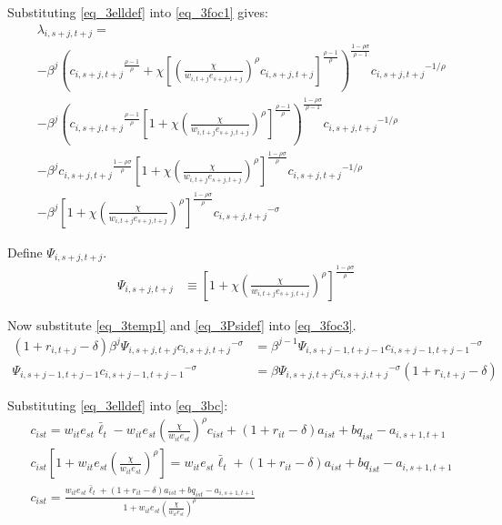 \documentclass[letterpaper,12pt]{article}
\theoremstyle{definition}
\numberwithin{equation}{section}
\begin{document}
\begin{spacing}{1.5}
	Substituting \eqref{eq_3elldef} into \eqref{eq_3foc1} gives:
	\begin{align}
	    & \lambda_{i,s+j,t+j} = \nonumber \\
		& - \beta^j \left( {c_{i,s+j,t+j}}^{\frac{\rho-1}{\rho}} + \chi \left[\left(\frac{\chi} {w_{i,t+j} e_{s+j,t+j}}\right)^{\rho} c_{i,s+j,t+j}\right]^{\frac{\rho-1}{\rho}}\right)^{\frac{1-\rho \sigma}{\rho-1}} {c_{i,s+j,t+j}}^{-1/\rho} \nonumber \\
		& - \beta^j \left( {c_{i,s+j,t+j}}^{\frac{\rho-1}{\rho}} \left[1 + \chi \left(\frac{\chi} {w_{i,t+j} e_{s+j,t+j}}\right)^{\rho} \right]^{\frac{\rho-1}{\rho}}\right)^{\frac{1-\rho \sigma}{\rho-1}} {c_{i,s+j,t+j}}^{-1/\rho} \nonumber \\
		& - \beta^j {c_{i,s+j,t+j}}^{\frac{1-\rho \sigma}{\rho}} \left[1 + \chi \left(\frac{\chi} {w_{i,t+j} e_{s+j,t+j}}\right)^{\rho} \right]^{\frac{1-\rho \sigma}{\rho}} {c_{i,s+j,t+j}}^{-1/\rho} \nonumber \\
		& - \beta^j \left[1 + \chi \left(\frac{\chi} {w_{i,t+j} e_{s+j,t+j}}\right)^{\rho} \right]^{\frac{1-\rho \sigma}{\rho}} {c_{i,s+j,t+j}}^{-\sigma} \label{eq_3temp1}
	\end{align}

	Define $\Psi_{i,s+j,t+j}$.
	\begin{align}
        \Psi_{i,s+j,t+j} & \equiv \left[1 + \chi \left(\frac{\chi} {w_{i,t+j} e_{s+j,t+j}}\right)^{\rho} \right]^{\frac{1-\rho \sigma}{\rho}} \label{eq_3Psidef}
	\end{align}	

	Now substitute \eqref{eq_3temp1} and \eqref{eq_3Psidef} into \eqref{eq_3foc3}.
	\begin{align}
        (1+r_{i,t+j}-\delta) \beta^j \Psi_{i,s+j,t+j} {c_{i,s+j,t+j}}^{-\sigma} & = \beta^{j-1} \Psi_{i,s+j-1,t+j-1} {c_{i,s+j-1,t+j-1}}^{-\sigma} \nonumber \\
        \Psi_{i,s+j-1,t+j-1} {c_{i,s+j-1,t+j-1}}^{-\sigma} & = \beta \Psi_{i,s+j,t+j} {c_{i,s+j,t+j}}^{-\sigma} (1+r_{i,t+j}-\delta) \label{eq_3Euler}
	\end{align}	

	Substituting \eqref{eq_3elldef} into \eqref{eq_3bc}:
	\begin{align}
		& c_{ist} = w_{it} e_{st} \bar \ell_t - w_{it} e_{st} \left(\frac{\chi} {w_{it} e_{st}}\right)^{\rho} c_{ist} + (1+r_{it}-\delta)a_{ist} + bq_{ist} - a_{i,s+1,t+1} \nonumber \\
		& c_{ist} \left[ 1 + w_{it} e_{st} \left(\frac{\chi} {w_{it} e_{st}}\right)^{\rho} \right] = w_{it} e_{st} \bar \ell_t + (1+r_{it}-\delta)a_{ist} + bq_{ist} - a_{i,s+1,t+1} \nonumber \\
		& c_{ist} = \frac{w_{it} e_{st} \bar \ell_t + (1+r_{it}-\delta)a_{ist} + bq_{ist} - a_{i,s+1,t+1}} {1 + w_{it} e_{st} \left(\frac{\chi} {w_{it} e_{st}}\right)^{\rho}} \label{eq_3cdef}
	\end{align}


\end{spacing}
\end{document}
